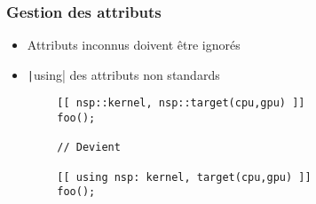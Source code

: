 \documentclass[C++.tex]{subfiles}
\begin{document}
\begin{frame}[fragile]
	\frametitle{Gestion des attributs}
	\begin{itemize}
		\item Attributs inconnus doivent être ignorés


		\item \texttt|using| des attributs non standards
	\end{itemize}

	\begin{verbatim}
		[[ nsp::kernel, nsp::target(cpu,gpu) ]]
		foo();

		// Devient

		[[ using nsp: kernel, target(cpu,gpu) ]]
		foo();
	\end{verbatim}

\end{frame}
\end{document}
